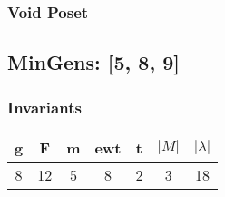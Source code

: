 \documentclass[a4paper]{article}
\begin{document}
\hfill\begin{minipage}{0.48\textwidth}
\subsubsection*{Void Poset}
\centering
{}
\end{minipage}
\newpage\subsection{MinGens: [5, 8, 9]}
\noindent\begin{minipage}{0.6\textwidth}
\subsubsection*{Invariants}
\centering
\begin{tabular}{|c|c|c|c|c|c|c|}
\toprule
g & F & m & ewt & t & \(|M|\) & \(|\lambda|\) \\
\midrule
8 & 12 & 5 & 8 & 2 & 3 & 18 \\
\bottomrule
\end{tabular}
\end{minipage}%
\end{document}
